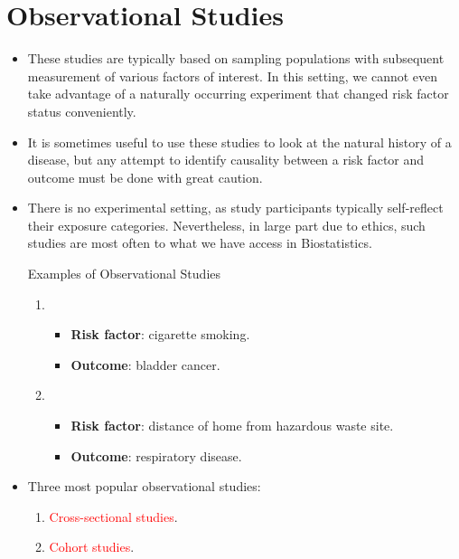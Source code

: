 \section{Observational Studies}
\begin{itemize}
    \item These studies are typically based on sampling populations with
          subsequent measurement of various factors of interest. In this
          setting, we cannot even take advantage of a naturally
          occurring experiment that changed risk factor status conveniently.
    \item It is sometimes useful to use these studies to look at the
          natural history of a disease, but any attempt to identify
          causality between a risk factor and outcome must be done with
          great caution.
    \item There is no experimental setting, as study participants
          typically self-reflect their exposure categories. Nevertheless, in
          large part due to ethics, such studies are most often to what
          we have access in Biostatistics.
          \begin{Example}{Examples of Observational Studies}
              \begin{enumerate}
                  \item \begin{itemize}
                            \item \textbf{Risk factor}: cigarette smoking.
                            \item \textbf{Outcome}: bladder cancer.
                        \end{itemize}
                  \item \begin{itemize}
                            \item \textbf{Risk factor}: distance of home from hazardous waste site.
                            \item \textbf{Outcome}: respiratory disease.
                        \end{itemize}
              \end{enumerate}
          \end{Example}
    \item Three most popular observational studies:
          \begin{enumerate}
              \item \textcolor{Red}{Cross-sectional studies}.
              \item \textcolor{Red}{Cohort studies}.

\end{enumerate}
\end{itemize}
